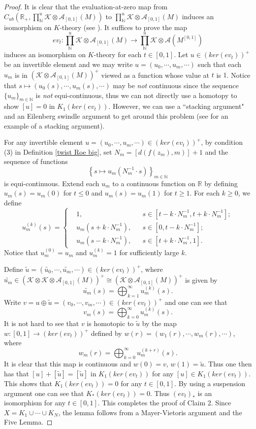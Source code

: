 \documentclass[11pt]{article}
\theoremstyle{definition}
\theoremstyle{plain}
\def\IN{\mathbb N}\def\IR{\mathbb R}\def\IE{\mathbb E}\def\IC{\mathbb C}\def\IL{\mathbb L}\def\IQ{\mathbb Q}\def\IA{\mathbb A}\def\IZ{\mathbb Z}
\def\A{\mathcal A}\def\C{\mathcal C}\def\B{\mathcal B}\def\E{\mathcal E}\def\O{\mathcal O}\def\h{\mathfrak h}\def\K{\mathcal K}\def\F{\mathcal F}\def\P{\mathcal P}\def\L{\mathcal L}\def\R{\mathcal R}\def\Q{\mathcal Q}\def\H{\mathcal H}\def\S{\mathcal S}\def\N{\mathcal N}\def\U{\mathcal U}\def\V{\mathcal V}
\def\ox{\otimes}
\def\wt{\widetilde}
\def\ox{\otimes}
\begin{document}
\begin{proof}
It is clear that the evaluation-at-zero map from $C_{ub}(\IR_+,\prod^u_{\IN}\K\ox\A_{[0,1]}(M))$ to $\prod^u_{\IN}\K\ox\A_{[0,1]}(M)$ induces an isomorphism on $K$-theory (see \cite[Lemma 12.4.3]{HIT2020}). It suffices to prove the map
$$ev_t:\prod^u_{\IN}\K\ox\A_{[0,1]}(M)\to\prod^u_{\IN}\K\ox\A(M^{[0,1]})$$
induces an isomorphism on $K$-theory for each $t\in[0,1]$. Let $u\in (ker(ev_t))^+$ be an invertible element and we may write $u=(u_0,\cdots,u_m,\cdots)$ such that each $u_m$ is in $(\K\ox\A_{[0,1]}(M))^+$ viewed as a function whose value at $t$ is $1$. Notice that $s\mapsto (u_0(s),\cdots, u_m(s),\cdots)$ may be \emph{not} continuous since the sequence $\{u_m\}_{m\in\IN}$ is \emph{not} equi-continuous, thus we can not directly use a homotopy to show $[u]=0$ in $K_1(ker(ev_t))$. However, we can use a ``stacking argument" and an Eilenberg swindle argument to get around this problem (see \cite[Proposition 12.6.3]{HIT2020} for an example of a stacking argument).

For any invertible element $u=(u_0,\cdots,u_m,\cdots)\in (ker(ev_t))^+$, by condition (3) in Definition \ref{twist Roe big}, set $N_m=[d(f(z_m),m)]+1$ and the sequence of functions 
$$\left\{s\mapsto u_m(N_m^{-1}\cdot s)\right\}_{m\in\IN}$$
is equi-continuous. Extend each $u_m$ to a continuous function on $\IR$ by defining $u_m(s)=u_m(0)$ for $t\leq0$ and $u_m(s)=u_m(1)$ for $t\geq 1$. For each $k\geq 0$, we define
$$u_m^{(k)}(s)=\left\{\begin{aligned}&1,&&s\in\left[t-k\cdot{N_m^{-1}},t+k\cdot{N_m^{-1}}\right];\\
&u_m\left(s+k\cdot{N_m^{-1}}\right),&&s\in\left[0,t-k\cdot{N_m^{-1}}\right];\\
&u_m\left(s-k\cdot{N_m^{-1}}\right),&&s\in\left[t+k\cdot{N_m^{-1}},1\right].\end{aligned}\right.$$
Notice that $u_m^{(0)}=u_m$ and $u_m^{(k)}=1$ for sufficiently large $k$.


Define $\wt{u}=(\wt{u_0},\cdots,\wt{u_m},\cdots)\in (ker(ev_t))^+$, where $\wt{u_m}\in (\K\ox\K\ox\A_{[0,1]}(M))^+\cong(\K\ox\A_{[0,1]}(M))^+$ is given by
$$\wt{u_m}(s)=\bigoplus_{k=1}^{\infty}u_m^{(k)}(s).$$
Write $v=u\oplus\wt u=(v_0,\cdots,v_m,\cdots)\in (ker(ev_t))^+$ and one can see that
$$v_m(s)=\bigoplus_{k=0}^{\infty}u_m^{(k)}(s).$$
It is not hard to see that $v$ is homotopic to $\wt u$ by the map $w:[0,1]\to(ker(ev_t))^+$ defined by $w(r)=(w_1(r),\cdots,w_m(r),\cdots)$, where
$$w_m(r)=\bigoplus_{k=0}^{\infty}u_m^{(k+r)}(s).$$
It is clear that this map is continuous and $w(0)=v$, $w(1)=\wt u$. Thus one then has that $[u]+[\wt u]=[\wt u]$ in $K_1(ker(ev_t))$ for any $[u]\in K_1(ker(ev_t))$. This shows that $K_1(ker(ev_t))=0$ for any $t\in[0,1]$. By using a suspension argument one can see that $K_*(ker(ev_t))=0$. Thus $(ev_t)_*$ is an isomorphism for any $t\in[0,1]$.
This completes the proof of Claim 2.
Since $X=K_1\cup \cdots\cup K_N$, the lemma follows from a Mayer-Vietoris argument and the Five Lemma.
\end{proof}
\end{document}
